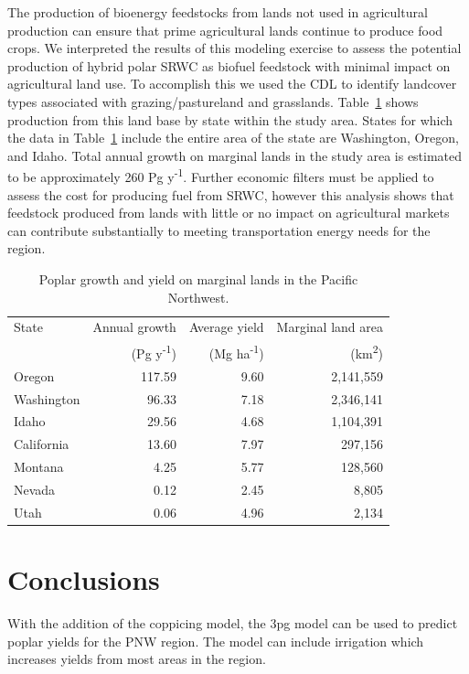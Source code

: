 \documentclass[preprint,review,12pt]{elsarticle}
\begin{document}
The production of bioenergy feedstocks from lands not used in
agricultural production can ensure that prime agricultural lands
continue to produce food crops. We interpreted the results of this
modeling exercise to assess the potential production of hybrid polar
\ac{SRWC} as biofuel feedstock with minimal impact on agricultural
land use. To accomplish this we used the \ac{CDL} to identify
landcover types associated with grazing/pastureland and
grasslands. Table~\ref{tab:growth} shows production from this land
base by state within the study area. States for which the data in
Table~\ref{tab:growth} include the entire area of the state are
Washington, Oregon, and Idaho. Total annual growth on marginal lands
in the study area is estimated to be approximately 260 Pg y\textsuperscript{-1}. Further
economic filters must be applied to assess the cost for producing fuel
from \ac{SRWC}, however this analysis shows that feedstock produced
from lands with little or no impact on agricultural markets can
contribute substantially to meeting transportation energy needs for
the region.
\begin{table}[htbp]
\caption{Poplar growth and yield on marginal lands in the Pacific Northwest.}
\begin{tabular}{ |lrrr|}
\hline
State &  Annual growth & Average yield & Marginal land area \\
& (Pg y\textsuperscript{-1})& (Mg ha\textsuperscript{-1}) & (km\textsuperscript{2}) \\
\hline
Oregon & 117.59 & 9.60 &  2,141,559 \\
Washington & 96.33 & 7.18 &  2,346,141 \\
Idaho & 29.56 & 4.68 &  1,104,391 \\
California & 13.60 & 7.97 &    297,156 \\
Montana & 4.25 & 5.77 &    128,560 \\
Nevada & 0.12 & 2.45 &      8,805 \\
Utah & 0.06 & 4.96 &      2,134 \\
\hline
\end{tabular}

\label{tab:growth}
\end{table}

\section{Conclusions}
\label{sec:conclude}

With the addition of the coppicing model, the \ac{3pg} model can be
used to predict poplar yields for the \ac{PNW} region.  The model can
include irrigation which increases yields from most areas in the region.  
\end{document}

